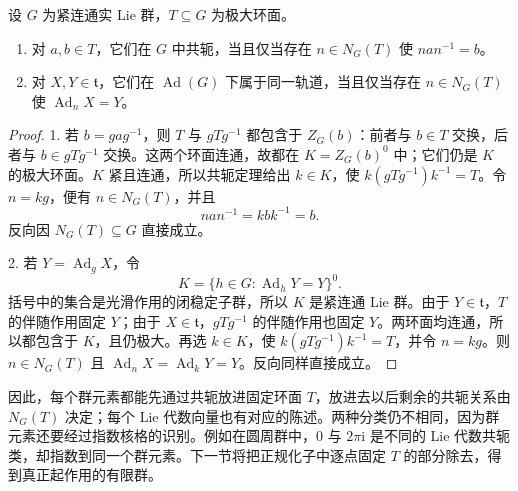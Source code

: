 \begin{proposition}\label{g1:prop:torus-conjugacy-normalizer}
	设 \(G\) 为紧连通实 Lie 群，\(T\subseteq G\) 为极大环面。
	\begin{enumerate}
		\item 对 \(a,b\in T\)，它们在 \(G\) 中共轭，当且仅当存在 \(n\in N_G(T)\) 使 \(nan^{-1}=b\)。
		\item 对 \(X,Y\in\mathfrak t\)，它们在 \(\operatorname{Ad}(G)\) 下属于同一轨道，当且仅当存在 \(n\in N_G(T)\) 使 \(\operatorname{Ad}_nX=Y\)。
	\end{enumerate}
\end{proposition}
\begin{proof}
	1. 若 \(b=gag^{-1}\)，则 \(T\) 与 \(gTg^{-1}\) 都包含于 \(Z_G(b)\)：前者与 \(b\in T\) 交换，后者与 \(b\in gTg^{-1}\) 交换。这两个环面连通，故都在 \(K=Z_G(b)^0\) 中；它们仍是 \(K\) 的极大环面。\(K\) 紧且连通，所以共轭定理给出 \(k\in K\)，使 \(k(gTg^{-1})k^{-1}=T\)。令 \(n=kg\)，便有 \(n\in N_G(T)\)，并且
	\[
		nan^{-1}=kbk^{-1}=b.
	\]
	反向因 \(N_G(T)\subseteq G\) 直接成立。

	2. 若 \(Y=\operatorname{Ad}_gX\)，令
	\[
		K=\{h\in G:\operatorname{Ad}_hY=Y\}^0.
	\]
	括号中的集合是光滑作用的闭稳定子群，所以 \(K\) 是紧连通 Lie 群。由于 \(Y\in\mathfrak t\)，\(T\) 的伴随作用固定 \(Y\)；由于 \(X\in\mathfrak t\)，\(gTg^{-1}\) 的伴随作用也固定 \(Y\)。两环面均连通，所以都包含于 \(K\)，且仍极大。再选 \(k\in K\)，使 \(k(gTg^{-1})k^{-1}=T\)，并令 \(n=kg\)。则 \(n\in N_G(T)\) 且 \(\operatorname{Ad}_nX=\operatorname{Ad}_kY=Y\)。反向同样直接成立。
\end{proof}

因此，每个群元素都能先通过共轭放进固定环面 \(T\)，放进去以后剩余的共轭关系由 \(N_G(T)\) 决定；每个 Lie 代数向量也有对应的陈述。两种分类仍不相同，因为群元素还要经过指数核格的识别。例如在圆周群中，\(0\) 与 \(2\pi\mathrm{i}\) 是不同的 Lie 代数共轭类，却指数到同一个群元素。下一节将把正规化子中逐点固定 \(T\) 的部分除去，得到真正起作用的有限群。
